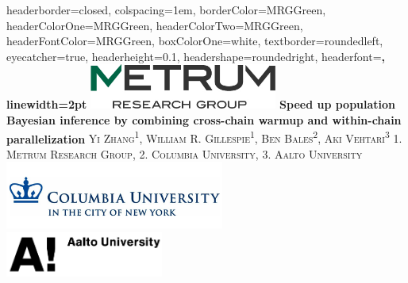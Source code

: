 \documentclass[landscape,a0paper,fontscale=0.45]{baposter} %
\begin{document}
\begin{poster}
{
headerborder=closed, %
colspacing=1em, %
borderColor=MRGGreen, %
headerColorOne=MRGGreen, %
headerColorTwo=MRGGreen, %
headerFontColor=MRGGreen, %
boxColorOne=white, %
textborder=roundedleft, %
eyecatcher=true, %
headerheight=0.1\textheight, %
headershape=roundedright, %
headerfont=\Large\bf\textsc, %
linewidth=2pt %
}
%
{\includegraphics[height=4em]{graphics/logo.jpg}} %
{\bf{Speed up population Bayesian inference by combining cross-chain warmup and within-chain parallelization}\vspace{0.8em}} %
{\textsc{ Yi Zhang\textsuperscript{1}, William R. Gillespie\textsuperscript{1}, Ben Bales\textsuperscript{2}, Aki Vehtari\textsuperscript{3} \hspace{12pt} \normalsize{1. Metrum Research Group, 2. Columbia University, 3. Aalto University}}} %
{\includegraphics[height=6em]{graphics/alumnae_columbia.png}\\
\includegraphics[height=4em]{graphics/Aalto_EN_13_BLACK_1_Original.png}
} %



\end{poster}
\end{document}
